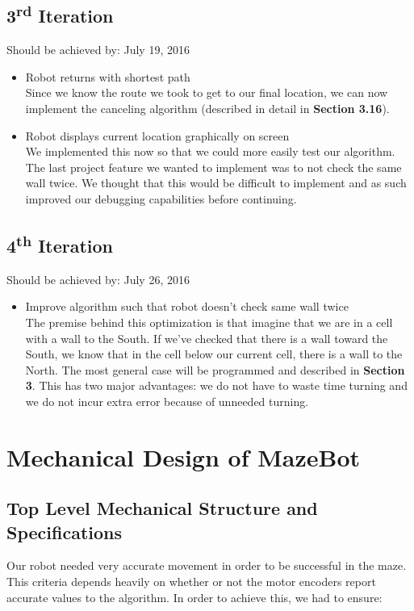 \documentclass[11pt]{article}
\newcommand{\ts}{\textsuperscript}
\begin{document}
\subsection{3\ts{rd} Iteration}
Should be achieved by: July 19, 2016
\begin{itemize}
\item Robot returns with shortest path\\
Since we know the route we took to get to our final location, we can now implement the canceling algorithm (described in detail in \textbf{Section 3.16}).
\item Robot displays current location graphically on screen\\
We implemented this now so that we could more easily test our algorithm. The last project feature we wanted to implement was to not check the same wall twice. We thought that this would be difficult to implement and as such improved our debugging capabilities before continuing.
\end{itemize}

\subsection{4\ts{th} Iteration}
Should be achieved by: July 26, 2016
\begin{itemize}
\item Improve algorithm such that robot doesn't check same wall twice\\
The premise behind this optimization is that imagine that we are in a cell with a wall to the South. If we've checked that there is a wall toward the South, we know that in the cell below our current cell, there is a wall to the North. The most general case will be programmed and described in \textbf{Section 3}. This has two major advantages: we do not have to waste time turning and we do not incur extra error because of unneeded turning.
\end{itemize}
\newpage




\section{Mechanical Design of MazeBot}
\subsection{Top Level Mechanical Structure and Specifications}
Our robot needed very accurate movement in order to be successful in the maze. This criteria depends heavily on whether or not the motor encoders report accurate values to the algorithm. In order to achieve this, we had to ensure:
\end{document}
